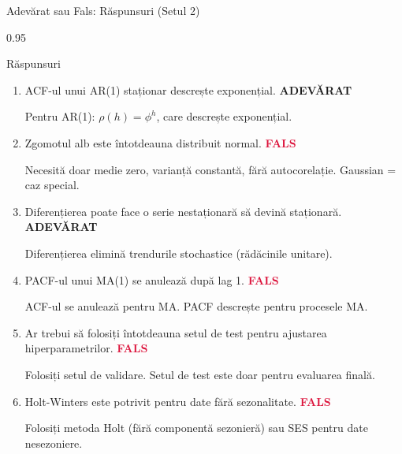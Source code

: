 \documentclass[9pt, aspectratio=169, t]{beamer}
\begin{document}
\begin{frame}{Adevărat sau Fals: Răspunsuri (Setul 2)}
    \begin{cminipage}{0.95\textwidth}
    \begin{exampleblock}{Răspunsuri}
    {\small
    \begin{enumerate}\setlength{\itemsep}{0pt}
        \item ACF-ul unui AR(1) staționar descrește exponențial. \hfill \textbf{\textcolor{Forest}{ADEVĂRAT}}

        {\footnotesize \textcolor{MediumGray}{Pentru AR(1): $\rho(h) = \phi^h$, care descrește exponențial.}}

        \item Zgomotul alb este întotdeauna distribuit normal. \hfill \textbf{\textcolor{Crimson}{FALS}}

        {\footnotesize \textcolor{MediumGray}{Necesită doar medie zero, varianță constantă, fără autocorelație. Gaussian = caz special.}}

        \item Diferențierea poate face o serie nestaționară să devină staționară. \hfill \textbf{\textcolor{Forest}{ADEVĂRAT}}

        {\footnotesize \textcolor{MediumGray}{Diferențierea elimină trendurile stochastice (rădăcinile unitare).}}

        \item PACF-ul unui MA(1) se anulează după lag 1. \hfill \textbf{\textcolor{Crimson}{FALS}}

        {\footnotesize \textcolor{MediumGray}{ACF-ul se anulează pentru MA. PACF descrește pentru procesele MA.}}

        \item Ar trebui să folosiți întotdeauna setul de test pentru ajustarea hiperparametrilor. \hfill \textbf{\textcolor{Crimson}{FALS}}

        {\footnotesize \textcolor{MediumGray}{Folosiți setul de validare. Setul de test este doar pentru evaluarea finală.}}

        \item Holt-Winters este potrivit pentru date fără sezonalitate. \hfill \textbf{\textcolor{Crimson}{FALS}}

        {\footnotesize \textcolor{MediumGray}{Folosiți metoda Holt (fără componentă sezonieră) sau SES pentru date nesezoniere.}}
    \end{enumerate}
    }
    \end{exampleblock}
    \end{cminipage}
\end{frame}
\end{document}
